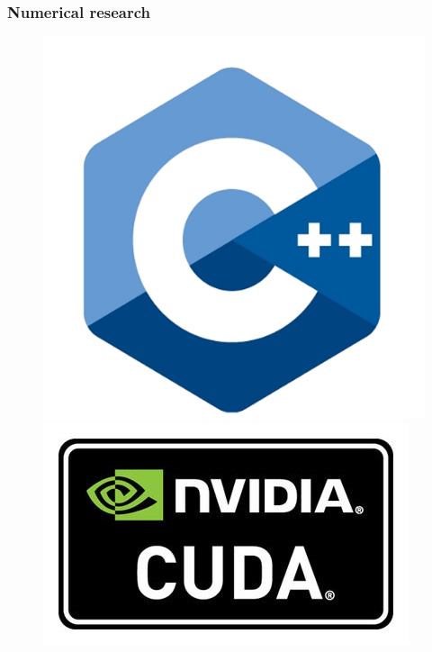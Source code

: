 \documentclass[fullscreen=true, unicode, bookmarks=false]{beamer}
\begin{document}
\begin{frame}
\frametitle{ Numerical research } 

\begin{figure}
\includegraphics[scale=0.09]{cplusplus.png}
\hfill 
\includegraphics[scale=0.34]{cuda.jpg}  
\hfill 

\end{figure}
\end{frame}
\end{document}
